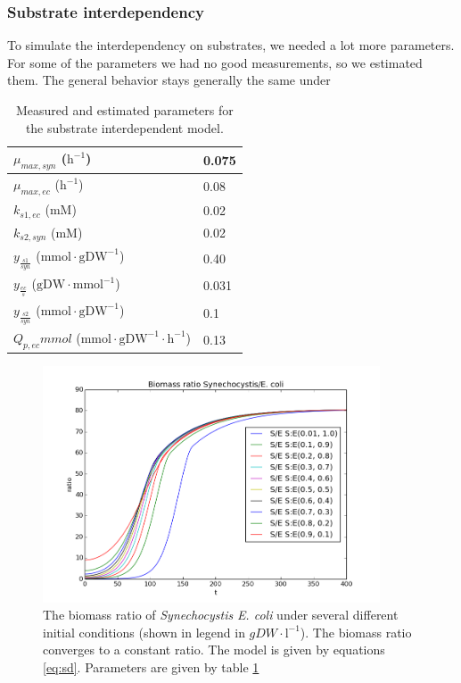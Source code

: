\documentclass[10pt]{report}
\begin{document}
\pagebreak
\newpage
\subsubsection{Substrate interdependency}
To simulate the interdependency on substrates, we needed a lot more parameters. For some of the parameters we had no good measurements, so we estimated them. The general behavior stays generally the same under

\begin{table}[!ht]
 \begin{center}  
  \begin{tabular}{|l|l|}
   \hline
   $\mu_{max,syn}$ ($\text{h}^{-1}$) & 0.075 \\ \hline
   $\mu_{max,ec}$ ($\text{h}^{-1}$) & 0.08 \\ \hline
   $k_{s1,ec}$ ($\text{mM}$) & 0.02 \\ \hline
   $k_{s2,syn}$ ($\text{mM}$) & 0.02 \\ \hline
   $y_{\frac{s1}{syn}}$ ($\text{mmol}\cdot\text{gDW}^{-1}$) & 0.40 \\ \hline
   $y_{\frac{ec}{s}}$ ($\text{gDW}\cdot\text{mmol}^{-1}$) & 0.031 \\ \hline
   $y_{\frac{s2}{syn}}$ ($\text{mmol}\cdot\text{gDW}^{-1}$) & 0.1 \\ \hline
   $Q_{p,ec} mmol$ ($\text{mmol}\cdot \text{gDW}^{-1}\cdot\text{h}^{-1}$) & 0.13 \\
   \hline   
  \end{tabular}
  \caption{Measured and estimated parameters for the substrate interdependent model.}
  \label{tab:sdp}
 \end{center}
\end{table}


\begin{figure}[!ht]
 \begin{center}  
     \includegraphics[width=10cm]{ratios_interdependent_1.png}
     \caption{The biomass ratio of \textit{Synechocystis} \textit{E. coli} under several different initial conditions (shown in legend in $gDW\cdot \text{l}^{-1}$). The biomass ratio converges to a constant ratio. The model is given by equations \ref{eq:sd}. Parameters are given by table \ref{tab:sdp}}
    \label{fig:subrat}
    \end{center}
\end{figure}
\end{document}
